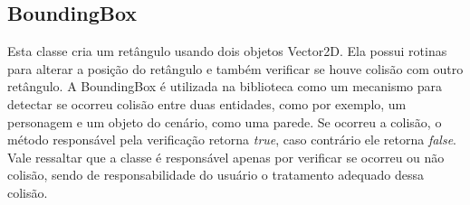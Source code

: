 \subsection{BoundingBox}
%
%
Esta classe cria um retângulo usando dois objetos Vector2D. Ela possui rotinas para alterar a posição do retângulo e também verificar se houve colisão com outro retângulo. A BoundingBox é utilizada na biblioteca como um mecanismo para detectar se ocorreu colisão entre duas entidades, como por exemplo, um personagem e um objeto do cenário, como uma parede. Se ocorreu a colisão, o método responsável pela verificação retorna \textit{true}, caso contrário ele retorna \textit{false}. Vale ressaltar que a classe é responsável apenas por verificar se ocorreu ou não colisão, sendo de responsabilidade do usuário o tratamento adequado dessa colisão.
%
%
